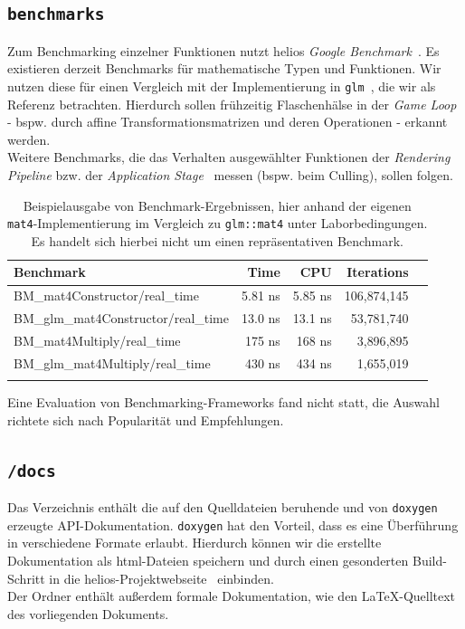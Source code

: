 \subsection*{\texttt{benchmarks}}
\noindent
Zum Benchmarking einzelner Funktionen nutzt helios \textit{Google Benchmark}~\cite[]{googlebenchmarkgithub}.
Es existieren derzeit Benchmarks für mathematische Typen und Funktionen.
Wir nutzen diese für einen Vergleich mit der Implementierung in \texttt{glm}~\cite[]{glmGithub}, die wir als Referenz betrachten.
Hierdurch sollen frühzeitig Flaschenhälse in der \textit{Game Loop} - bspw.  durch affine Transformationsmatrizen und deren Operationen - erkannt werden.\\
Weitere Benchmarks, die das Verhalten ausgewählter Funktionen der \textit{Rendering Pipeline} bzw. der \textit{Application Stage}~\cite[687]{Gre19} messen (bspw. beim Culling), sollen folgen.
\begin{table}[h!]
    \centering
    \begin{tabular}{lrrrr}
        \hline
        \textbf{Benchmark} & \textbf{Time} & \textbf{CPU} & \textbf{Iterations} \\
        \hline
        BM\_mat4Constructor/real\_time         & 5.81 ns  & 5.85 ns  & 106{,}874{,}145 \\
        BM\_glm\_mat4Constructor/real\_time    & 13.0 ns  & 13.1 ns  & 53{,}781{,}740 \\
        BM\_mat4Multiply/real\_time            & 175 ns   & 168 ns   & 3{,}896{,}895 \\
        BM\_glm\_mat4Multiply/real\_time       & 430 ns   & 434 ns   & 1{,}655{,}019 \\
        \hline\\
    \end{tabular}
    \label{tab:mat4-benchmark}
    \caption{Beispielausgabe von Benchmark-Ergebnissen, hier anhand der eigenen \texttt{mat4}-Implementierung im Vergleich zu \texttt{glm::mat4} unter Laborbedingungen. Es handelt sich hierbei nicht um einen repräsentativen Benchmark.}
\end{table}

\noindent
Eine Evaluation von Benchmarking-Frameworks fand nicht statt, die Auswahl richtete sich nach Popularität und Empfehlungen.

\subsection*{\texttt{/docs}}
\noindent
Das Verzeichnis enthält die auf den Quelldateien beruhende und von \texttt{doxygen}~\cite[]{Doxygen} erzeugte API-Dokumentation.
\texttt{doxygen} hat den Vorteil, dass es eine Überführung in verschiedene Formate erlaubt. Hierdurch können wir die erstellte Dokumentation als html-Dateien speichern und durch einen gesonderten Build-Schritt in die helios-Projektwebseite~\cite[]{helios} einbinden.\\
Der Ordner enthält außerdem formale Dokumentation, wie den \LaTeX-Quelltext des vorliegenden Dokuments.

